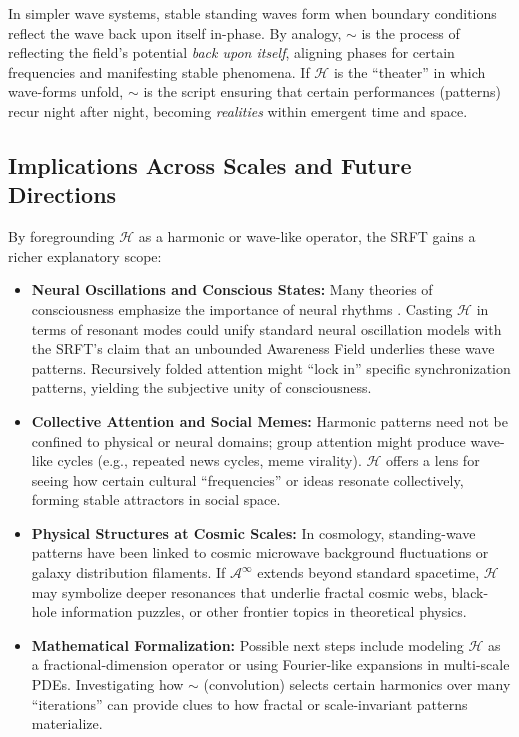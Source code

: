 \documentclass[12pt,a4paper]{article}
\begin{document}
In simpler wave systems, stable standing waves form when boundary conditions reflect the
wave back upon itself in-phase. By analogy, \(\sim\) is the process of reflecting the
field’s potential \emph{back upon itself}, aligning phases for certain frequencies and
manifesting stable phenomena. If \(\mathcal{H}\) is the ``theater'' in which wave-forms
unfold, \(\sim\) is the script ensuring that certain performances (patterns) recur
night after night, becoming \emph{realities} within emergent time and space.

\subsection{Implications Across Scales and Future Directions}
\label{subsec:harmonics-implications}

By foregrounding \(\mathcal{H}\) as a harmonic or wave-like operator, the SRFT gains a
richer explanatory scope:

\begin{itemize}
    \item \textbf{Neural Oscillations and Conscious States:} Many theories of consciousness
    emphasize the importance of neural rhythms \cite{tononi2008,friston2010}. Casting
    \(\mathcal{H}\) in terms of resonant modes could unify standard neural oscillation
    models with the SRFT’s claim that an unbounded Awareness Field underlies these wave
    patterns. Recursively folded attention might ``lock in'' specific synchronization
    patterns, yielding the subjective unity of consciousness.
    \item \textbf{Collective Attention and Social Memes:} Harmonic patterns need not be
    confined to physical or neural domains; group attention might produce wave-like
    cycles (e.g., repeated news cycles, meme virality). \(\mathcal{H}\) offers a lens
    for seeing how certain cultural “frequencies” or ideas resonate collectively, forming
    stable attractors in social space.
    \item \textbf{Physical Structures at Cosmic Scales:} In cosmology, standing-wave
    patterns have been linked to cosmic microwave background fluctuations or galaxy
    distribution filaments. If \(\mathscr{A}^\infty\) extends beyond standard spacetime,
    \(\mathcal{H}\) may symbolize deeper resonances that underlie fractal cosmic webs,
    black-hole information puzzles, or other frontier topics in theoretical physics.
    \item \textbf{Mathematical Formalization:} Possible next steps include modeling
    \(\mathcal{H}\) as a fractional-dimension operator or using Fourier-like expansions
    in multi-scale PDEs. Investigating how \(\sim\) (convolution) selects certain
    harmonics over many “iterations” can provide clues to how fractal or scale-invariant
    patterns materialize. 
\end{itemize}
\end{document}
